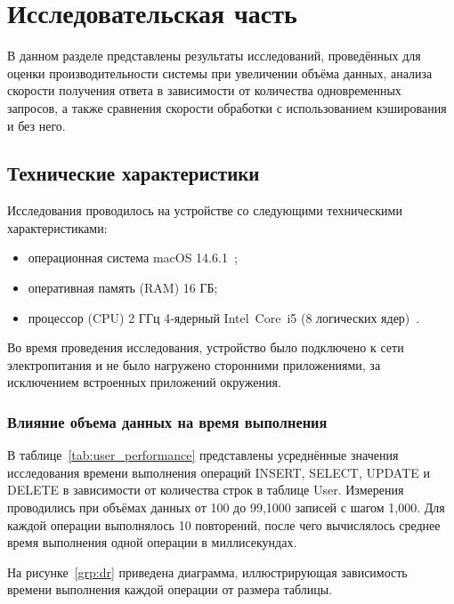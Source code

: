 \section{Исследовательская часть}

В данном разделе представлены результаты исследований, проведённых для оценки производительности системы при увеличении объёма данных, анализа скорости получения ответа в зависимости от количества одновременных запросов, а также сравнения скорости обработки с использованием кэширования и без него.

\subsection{Технические характеристики}

Исследования проводилось на устройстве со следующими техническими характеристиками:

\begin{itemize}[label=---]
	\item операционная система macOS 14.6.1~\cite{macos};
	
	\item оперативная память (RAM) 16 ГБ;
	
	\item процессор (CPU) 2 ГГц 4‑ядерный Intel Core i5 (8 логических ядер)~\cite{intel}.
	
\end{itemize}

Во время проведения исследования, устройство было подключено к сети электропитания и не было нагружено сторонними приложениями, за исключением встроенных приложений окружения.

\subsubsection*{\normalsize  Влияние объема данных на время выполнения}


В таблице~\ref{tab:user_performance} представлены усреднённые значения исследования времени выполнения операций INSERT, SELECT, UPDATE и DELETE в зависимости от количества строк в таблице User. Измерения проводились при объёмах данных от 100 до 99{,}1000 записей с шагом 1{,}000. Для каждой операции выполнялось 10 повторений, после чего вычислялось среднее время выполнения одной операции в миллисекундах.

На рисунке~\ref{grp:dr} приведена диаграмма, иллюстрирующая зависимость времени выполнения каждой операции от размера таблицы.


